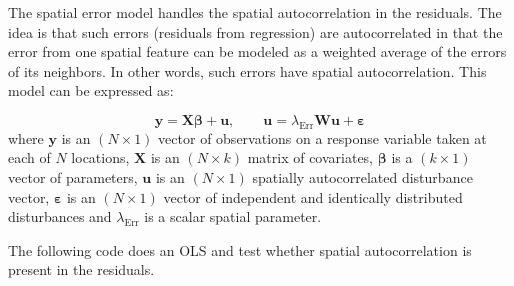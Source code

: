 \documentclass[
  11pt,
]{book}
\begin{document}
The spatial error model handles the spatial autocorrelation in the residuals. The idea is that such errors (residuals from regression) are autocorrelated in that the error from one spatial feature can be modeled as a weighted average of the errors of its neighbors. In other words, such errors have spatial autocorrelation. This model can be expressed as:

\[
{\mathbf y} = {\mathbf X}{\mathbf \beta} + {\mathbf u},
\qquad {\mathbf u} = \lambda_{\mathrm{Err}} {\mathbf W} {\mathbf u} + {\mathbf \varepsilon}
\]
where \({\mathbf y}\) is an \((N \times 1)\) vector of observations on a response variable taken at each of \(N\) locations, \({\mathbf X}\) is an \((N \times k)\) matrix of covariates, \({\mathbf \beta}\) is a \((k \times 1)\) vector of parameters, \({\mathbf u}\) is an \((N \times 1)\) spatially autocorrelated disturbance vector, \({\mathbf \varepsilon}\) is an \((N \times 1)\) vector of independent and identically distributed disturbances and \(\lambda_{\mathrm{Err}}\) is a scalar spatial parameter.

The following code does an OLS and test whether spatial autocorrelation is present in the residuals.
\end{document}
